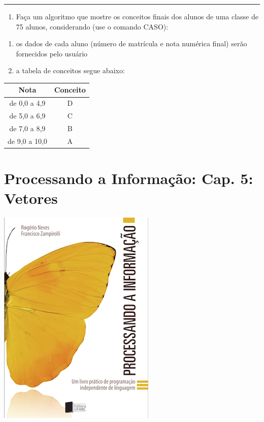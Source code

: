 \documentclass[12pt,a4paper]{article}
\providecommand{\tightlist}{%
      \setlength{\itemsep}{0pt}\setlength{\parskip}{0pt}}
\begin{document}
    \begin{center}\rule{0.5\linewidth}{0.5pt}\end{center}

\begin{enumerate}
\def\labelenumi{\arabic{enumi}.}
\setcounter{enumi}{13}
\tightlist
\item
  Faça um algoritmo que mostre os conceitos finais dos alunos de uma
  classe de 75 alunos, considerando (use o comando CASO):
\end{enumerate}

\begin{enumerate}
\def\labelenumi{\alph{enumi})}
\item
  os dados de cada aluno (número de matrícula e nota numérica final)
  serão fornecidos pelo usuário
\item
  a tabela de conceitos segue abaixo:
\end{enumerate}

\begin{longtable}[]{@{}cc@{}}
\toprule()
Nota & Conceito \\
\midrule()
\endhead
de 0,0 a 4,9 & D \\
de 5,0 a 6,9 & C \\
de 7,0 a 8,9 & B \\
de 9,0 a 10,0 & A \\
\bottomrule()
\end{longtable}

    \hypertarget{processando-a-informauxe7uxe3o-cap.-5-vetores}{%
\section{Processando a Informação: Cap. 5:
Vetores}\label{processando-a-informauxe7uxe3o-cap.-5-vetores}}

    \includegraphics{"figs/Capa_Processando_Informacao.jpg"}
\end{document}
